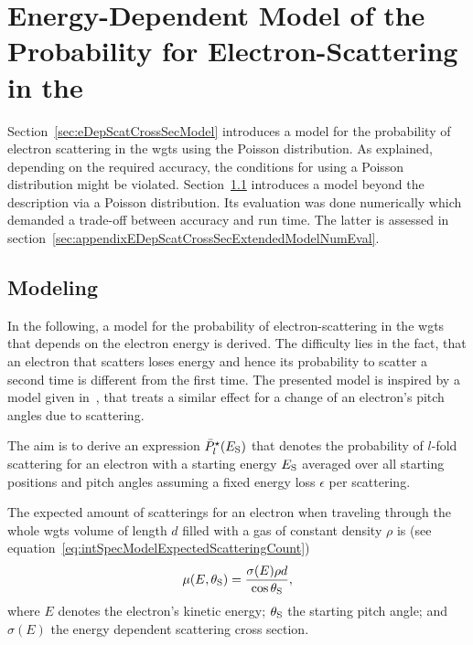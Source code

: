 \section{Energy-Dependent Model of the Probability for Electron-Scattering in the }
\label{sec:appendixEDepScatCrossSecExtendedModel}
Section~\ref{sec:eDepScatCrossSecModel} introduces a model for the probability of electron scattering in the \gls{wgts} using the Poisson distribution. As explained, depending on the required accuracy, the conditions for using a Poisson distribution might be violated. Section~\ref{sec:appendixEDepScatCrossSecExtendedModelFormalism} introduces a model beyond the description via a Poisson distribution. Its evaluation was done numerically which demanded a trade-off between accuracy and run time. The latter is assessed in section~\ref{sec:appendixEDepScatCrossSecExtendedModelNumEval}.
\subsection{Modeling}
\label{sec:appendixEDepScatCrossSecExtendedModelFormalism}
In the following, a model for the probability of electron-scattering in the \gls{wgts} that depends on the electron energy is derived. The difficulty lies in the fact, that an electron that scatters loses energy and hence its probability to scatter a second time is different from the first time. The presented model is inspired by a model given in~\cite{Groh2015}, that treats a similar effect for a change of an electron's pitch angles due to scattering. 

The aim is to derive an expression $\bar{P}^{\star}_l(E_\mathrm{S})$ that denotes the probability of $l$-fold scattering for an electron with a starting energy $E_\mathrm{S}$ averaged over all starting positions and pitch angles assuming a fixed energy loss $\epsilon$ per scattering.

The expected amount of scatterings for an electron when traveling through the whole \gls{wgts} volume of length $d$ filled with a gas of constant density $\rho$ is (see equation~\ref{eq:intSpecModelExpectedScatteringCount})
\begin{equation}
    \mu(E,\theta_\mathrm{S}) =
    \frac{\sigma(E)\rho d}{\cos\theta_\mathrm{S}},
\end{equation}
where $E$ denotes the electron's kinetic energy; $\theta_\mathrm{S}$ the starting pitch angle; and $\sigma(E)$ the energy dependent scattering cross section.

